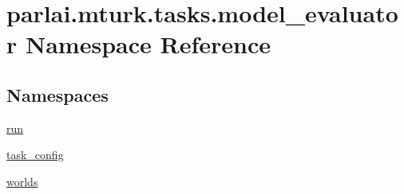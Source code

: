 \hypertarget{namespaceparlai_1_1mturk_1_1tasks_1_1model__evaluator}{}\section{parlai.\+mturk.\+tasks.\+model\+\_\+evaluator Namespace Reference}
\label{namespaceparlai_1_1mturk_1_1tasks_1_1model__evaluator}
\subsection*{Namespaces}
\begin{DoxyCompactItemize}
\item 
 \hyperlink{namespaceparlai_1_1mturk_1_1tasks_1_1model__evaluator_1_1run}{run}
\item 
 \hyperlink{namespaceparlai_1_1mturk_1_1tasks_1_1model__evaluator_1_1task__config}{task\+\_\+config}
\item 
 \hyperlink{namespaceparlai_1_1mturk_1_1tasks_1_1model__evaluator_1_1worlds}{worlds}
\end{DoxyCompactItemize}
